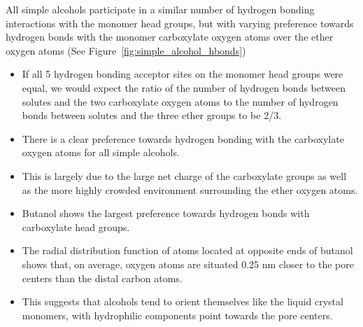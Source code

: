 \documentclass{article}
\begin{document}
  All simple alcohols participate in a similar number of hydrogen bonding interactions
  with the monomer head groups, but with varying preference towards hydrogen bonds with
  the monomer carboxylate oxygen atoms over the ether oxygen atoms (See Figure~\ref{fig:simple_alcohol_hbonds})
  \begin{itemize}
  	\item If all 5 hydrogen bonding acceptor sites on the monomer head groups were equal,
  	we would expect the ratio of the number of hydrogen bonds between solutes and the two 
  	carboxylate oxygen atoms to the number of hydrogen bonds between solutes and the three
  	ether groups to be 2/3. 
  	\item There is a clear preference towards hydrogen bonding with the carboxylate 
  	oxygen atoms for all simple alcohols.
  	\item This is largely due to the large net charge of the carboxylate groups as well
  	as the more highly crowded environment surrounding the ether oxygen atoms. %
  	\item Butanol shows the largest preference towards hydrogen bonds with carboxylate 
  	head groups.
  	\item The radial distribution function of atoms located at opposite ends of butanol
  	shows that, on average, oxygen atoms are situated 0.25 nm closer to the pore centers
  	than the distal carbon atoms.
  	\item This suggests that alcohols tend to orient themselves like the liquid crystal 
  	monomers, with hydrophilic components point towards the pore centers.
  \end{itemize}
  
\end{document}
